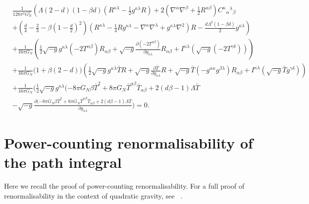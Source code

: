 \documentclass[aps,preprintnumbers,superscriptaddress,longbibliography]{revtex4-1}
\begin{document}
\begin{equation}
\label{eq: gravity_mpp}
\begin{split}
&\frac{1}{128 \pi^2 G_{N}^2}\left(\Lambda(2-d)(1-\beta d)\left(R^{\kappa \lambda}-\frac{1}{2}g^{\kappa \lambda}R\right)+2\left(\nabla^{\alpha}\nabla^{\beta}+\frac{1}{2}R^{\alpha \beta}\right)C^{\kappa}\text{}_{\alpha}\text{}^{\lambda}\text{}_{\beta} \right.\\
&\left.+\left(\frac{d}{4}-\frac{2}{3}-\beta \left(1-\frac{d}{2}\right)^2\right)\left(R^{\kappa \lambda}-\frac{1}{4}R g^{\kappa \lambda}-\nabla^{\kappa}\nabla^{\lambda}+g^{\kappa \lambda}\nabla^2\right)R-\frac{d\Lambda^2 (1 -\beta d)}{2}g^{\kappa \lambda}\right) \\
& +\frac{1}{16 \pi G_{N}}\left(\frac{1}{2}\sqrt{-g}g^{\kappa \lambda}(-2T^{\alpha \beta})R_{\alpha \beta}+\sqrt{-g}\frac{\partial (-2T^{\alpha \beta})}{\partial g_{\kappa \lambda}}R_{\alpha \beta}+I^{\kappa \lambda}(\sqrt{-g}(-2T^{\gamma \delta}))\right)\\
& +\frac{1}{16 \pi G_{N}}\big(1+\beta(2-d)\big)\left(\frac{1}{2}\sqrt{-g}g^{\kappa \lambda}\bar{T}R+\sqrt{-g}\frac{\partial \bar{T}}{\partial g_{\kappa \lambda}}R+\sqrt{-g}\bar{T}(-g^{\alpha \kappa}g^{\beta \lambda}) R_{\alpha \beta}+I^{\kappa \lambda}(\sqrt{-g}\bar{T} g^{\gamma \delta})\right)\\
& +\frac{1}{16 \pi G_{N}}\bigg(\frac{1}{2}\sqrt{-g}g^{\kappa \lambda}(-8 \pi G_{N}\beta\bar{T}^2+8 \pi G_{N}\bar{T}^{\alpha \beta}\bar{T}_{\alpha \beta}+2(d\beta-1)\Lambda\bar{T}\\
& -\sqrt{-g}\frac{\partial (-8 \pi G_{N}\beta\bar{T}^2+8 \pi G_{N}\bar{T}^{\alpha \beta}\bar{T}_{\alpha \beta}+2(d\beta-1)\Lambda\bar{T}}{\partial g_{\kappa \lambda}}\bigg)=0.
\end{split}
\end{equation}

\section{Power-counting renormalisability of the path integral}
\label{sec:renorm}




Here we recall the proof of power-counting renormalisability. For a full proof of renormalisability in the context of quadratic gravity, see ~\cite{stelle1977renormalization}. 
\end{document}
